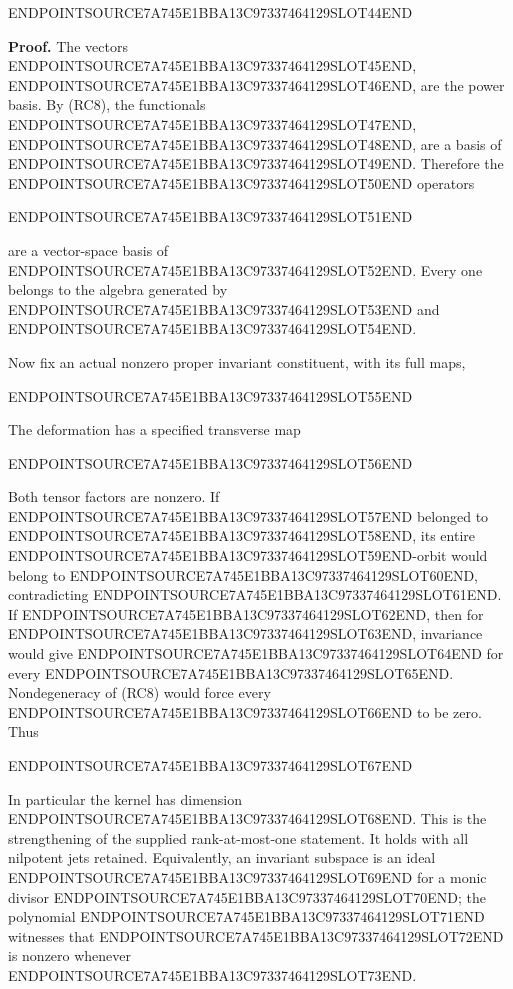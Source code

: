 ENDPOINTSOURCE7A745E1BBA13C97337464129SLOT44END

\textbf{Proof.} The vectors ENDPOINTSOURCE7A745E1BBA13C97337464129SLOT45END, ENDPOINTSOURCE7A745E1BBA13C97337464129SLOT46END, are the power basis. By (RC8), the functionals ENDPOINTSOURCE7A745E1BBA13C97337464129SLOT47END, ENDPOINTSOURCE7A745E1BBA13C97337464129SLOT48END, are a basis of ENDPOINTSOURCE7A745E1BBA13C97337464129SLOT49END. Therefore the ENDPOINTSOURCE7A745E1BBA13C97337464129SLOT50END operators

ENDPOINTSOURCE7A745E1BBA13C97337464129SLOT51END

are a vector-space basis of ENDPOINTSOURCE7A745E1BBA13C97337464129SLOT52END. Every one belongs to the algebra generated by ENDPOINTSOURCE7A745E1BBA13C97337464129SLOT53END and ENDPOINTSOURCE7A745E1BBA13C97337464129SLOT54END.

Now fix an actual nonzero proper invariant constituent, with its full maps,

ENDPOINTSOURCE7A745E1BBA13C97337464129SLOT55END

The deformation has a specified transverse map

ENDPOINTSOURCE7A745E1BBA13C97337464129SLOT56END

Both tensor factors are nonzero. If ENDPOINTSOURCE7A745E1BBA13C97337464129SLOT57END belonged to ENDPOINTSOURCE7A745E1BBA13C97337464129SLOT58END, its entire ENDPOINTSOURCE7A745E1BBA13C97337464129SLOT59END-orbit would belong to ENDPOINTSOURCE7A745E1BBA13C97337464129SLOT60END, contradicting ENDPOINTSOURCE7A745E1BBA13C97337464129SLOT61END. If ENDPOINTSOURCE7A745E1BBA13C97337464129SLOT62END, then for ENDPOINTSOURCE7A745E1BBA13C97337464129SLOT63END, invariance would give ENDPOINTSOURCE7A745E1BBA13C97337464129SLOT64END for every ENDPOINTSOURCE7A745E1BBA13C97337464129SLOT65END. Nondegeneracy of (RC8) would force every ENDPOINTSOURCE7A745E1BBA13C97337464129SLOT66END to be zero. Thus

ENDPOINTSOURCE7A745E1BBA13C97337464129SLOT67END

In particular the kernel has dimension ENDPOINTSOURCE7A745E1BBA13C97337464129SLOT68END. This is the strengthening of the supplied rank-at-most-one statement. It holds with all nilpotent jets retained. Equivalently, an invariant subspace is an ideal ENDPOINTSOURCE7A745E1BBA13C97337464129SLOT69END for a monic divisor ENDPOINTSOURCE7A745E1BBA13C97337464129SLOT70END; the polynomial ENDPOINTSOURCE7A745E1BBA13C97337464129SLOT71END witnesses that ENDPOINTSOURCE7A745E1BBA13C97337464129SLOT72END is nonzero whenever ENDPOINTSOURCE7A745E1BBA13C97337464129SLOT73END.

